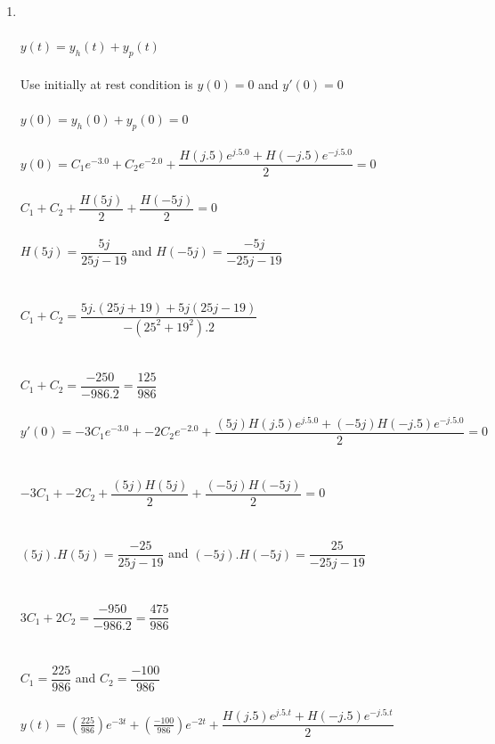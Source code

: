 \documentclass[10pt,a4paper, margin=1in]{article}
\begin{document}
\begin{enumerate}
\begin{enumerate}
        \\
    	\item %
        \\\\ $y(t) = y_h(t) + y_p(t)$
        \\\\ Use initially at rest condition is $y(0) = 0 $ and $ y'(0) = 0$
        \\\\ $y(0) = y_h(0) + y_p(0) = 0$
        \\\\ $y(0) =  C_1e^{-3.0} +  C_2e^{-2.0} + \dfrac{H(j.5)e^{j.5.0} + H(-j.5)e^{-j.5.0}}{2} = 0$
        \\\\ $C_1 + C_2 + \dfrac{H(5j)}{2} + \dfrac{H(-5j)}{2} = 0$
        \\\\ $ H(5j) = \dfrac{5j}{25j-19} $ \hspace*{10} and \hspace*{10} $ H(-5j) = \dfrac{-5j}{-25j-19}$
        \\\\\\ $C_1 + C_2 = \dfrac{5j.(25j+19) + 5j(25j-19)}{-(25^2 + 19^2) . 2}$
        \\\\\\ $C_1 + C_2 = \dfrac{-250}{-986 . 2} = \dfrac{125}{986}$
        \\\\ $y'(0) =  -3C_1e^{-3.0} +  -2C_2e^{-2.0} + \dfrac{(5j)H(j.5)e^{j.5.0} + (-5j)H(-j.5)e^{-j.5.0}}{2} = 0$
        \\\\\\ $-3C_1 + -2C_2 + \dfrac{(5j)H(5j)}{2} + \dfrac{(-5j)H(-5j)}{2} = 0$
        \\\\\\ $ (5j).H(5j) = \dfrac{-25}{25j-19} $ \hspace*{10} and \hspace*{10} $ (-5j).H(-5j) = \dfrac{25}{-25j-19}$
        \\\\\\ $3C_1 + 2C_2 = \dfrac{-950}{-986.2} = \dfrac{475}{986}$
        \\\\\\ $C_1 = \dfrac{225}{986}$ \hspace*{10} and \hspace*{10} $C_2 = \dfrac{-100}{986}$
        \\\\ $y(t) = (\frac{225}{986})e^{-3t} + (\frac{-100}{986})e^{-2t} + \dfrac{H(j.5)e^{j.5.t} + H(-j.5)e^{-j.5.t}}{2}$
        \\\\
    \end{enumerate}    
    

\end{enumerate}
\end{document}

